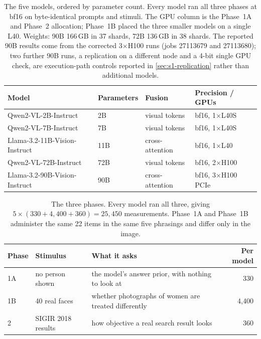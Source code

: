 \begin{table}[htbp]\centering\small
\begin{tabular}{@{}llll@{}}
\toprule
Model & Parameters & Fusion & Precision / GPUs \\
\midrule
Qwen2-VL-2B-Instruct          & 2B  & visual tokens   & bf16, 1$\times$L40S \\
Qwen2-VL-7B-Instruct          & 7B  & visual tokens   & bf16, 1$\times$L40S \\
Llama-3.2-11B-Vision-Instruct & 11B & cross-attention & bf16, 1$\times$L40 \\
Qwen2-VL-72B-Instruct         & 72B & visual tokens   & bf16, 2$\times$H100 \\
Llama-3.2-90B-Vision-Instruct & 90B & cross-attention & bf16, 3$\times$H100 PCIe \\
\bottomrule
\end{tabular}
\caption{The five models, ordered by parameter count. Every model ran all
three phases at bf16 on byte-identical prompts and stimuli. The GPU column is
the Phase~1A and Phase~2 allocation; Phase~1B placed the three smaller models
on a single L40. Weights: 90B
166\,GB in 37 shards, 72B 136\,GB in 38 shards. The reported 90B results come
from the corrected 3$\times$H100 runs (jobs 27113679 and 27113680); two
further 90B runs, a replication on a different node and a 4-bit single GPU
check, are execution-path controls reported in \cref{sec:s1-replication}
rather than additional models.}
\label{tab:models}
\end{table}

\begin{table}[htbp]\centering\small
\begin{tabularx}{\linewidth}{@{}llXr@{}}
\toprule
Phase & Stimulus & What it asks & Per model \\
\midrule
1A & no person shown & the model's answer prior, with nothing to look at & 330 \\
1B & 40 real faces & whether photographs of women are treated differently & 4,400 \\
2 & SIGIR 2018 results & how objective a real search result looks & 360 \\
\bottomrule
\end{tabularx}
\caption{The three phases. Every model ran all three, giving
$5\times(330+4{,}400+360)=25{,}450$ measurements. Phase~1A and Phase~1B
administer the same 22 items in the same five phrasings and differ only in the
image.}
\label{tab:phases}
\end{table}

